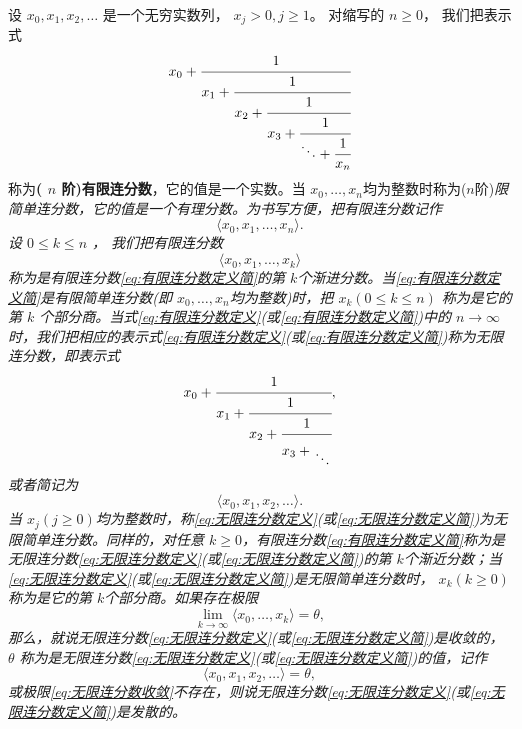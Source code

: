 \begin{definition}
	设 \( x_0, x_1, x_2, \dots \) 是一个无穷实数列， \( x_j > 0, j \ge 1 \)。 对缩写的 \( n \ge 0 \)， 我们把表示式
	\begin{equation}\label{eq:有限连分数定义}
		x_0 +
		\cfrac{1}{x_1 +
			\cfrac{1}{x_2 +
				\cfrac{1}{x_3 +
					\cfrac{1}{\ddots +
						\cfrac{1}{x_n}
					}}}}
	\end{equation}
	称为\textbf{( \( n \) 阶)有限连分数}，它的值是一个实数。当 \( x_0, \dots, x_n
	\)均为整数时称为($n$阶)\em{限简单连分数}，它的值是一个有理分数。为书写方便，把有限连分数记作
	\begin{equation}
		\langle x_0,x_1,\dots,x_n\rangle.
		\label{eq:有限连分数定义简}
	\end{equation}
	设 \( 0 \le k \le n \) ， 我们把有限连分数
	\begin{equation}
		\langle x_0, x_1, \dots, x_k\rangle
		\label{eq:第k个渐近分数}
	\end{equation}
	称为是有限连分数\eqref{eq:有限连分数定义简}的第 \( k \)个渐进分数。当\eqref{eq:有限连分数定义简}是有限简单连分数(即 \( x_0,\dots,x_n
	\)均为整数)时，把 \( x_k(0 \le k \le n) \) 称为是它的第 \( k \)
	个部分商。当式\eqref{eq:有限连分数定义}(或\eqref{eq:有限连分数定义简})中的 \( n \to \infty
	\)时，我们把相应的表示式\eqref{eq:有限连分数定义}(或\eqref{eq:有限连分数定义简})称为无限连分数，即表示式
	\begin{equation}\label{eq:无限连分数定义}
		x_0 + \cfrac{1}{x_1 +
			\cfrac{1}{x_2 +
				\cfrac{1}{x_3 +
					\genfrac{}{}{0pt}{}{\vphantom{1}}{\ddots}
				}}},
	\end{equation}
	或者简记为
	\begin{equation}
		\langle x_0, x_1, x_2, \dots\rangle.
		\label{eq:无限连分数定义简}
	\end{equation}
	当 \( x_j(j \ge 0) \)均为整数时，称\eqref{eq:无限连分数定义}(或\eqref{eq:无限连分数定义简})为无限简单连分数。同样的，对任意
	\( k \ge 0
	\)，有限连分数\eqref{eq:有限连分数定义简}称为是无限连分数\eqref{eq:无限连分数定义}(或\eqref{eq:无限连分数定义简})的第 \( k
	\)个渐近分数；当\eqref{eq:无限连分数定义}(或\eqref{eq:无限连分数定义简})是无限简单连分数时， \( x_k(k \ge 0) \)称为是它的第
	\( k \)个部分商。如果存在极限
	\begin{equation}
		\lim_{k\to\infty}\langle x_0,\dots,x_k\rangle = \theta,
		\label{eq:无限连分数收敛}
	\end{equation}
	那么，就说无限连分数\eqref{eq:无限连分数定义}(或\eqref{eq:无限连分数定义简})是收敛的， \( \theta \)
	称为是无限连分数\eqref{eq:无限连分数定义}(或\eqref{eq:无限连分数定义简})的值，记作
	\begin{equation}
		\langle x_0,x_1,x_2,\dots\rangle = \theta,
		\label{eq:无限连分数值}
	\end{equation}
	或极限\eqref{eq:无限连分数收敛}不存在，则说无限连分数\eqref{eq:无限连分数定义}(或\eqref{eq:无限连分数定义简})是发散的。
\end{definition}
